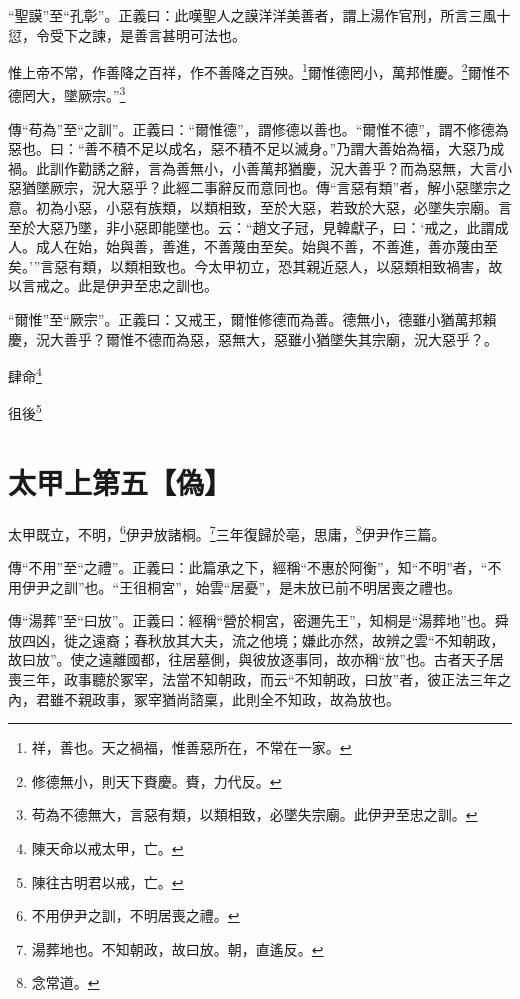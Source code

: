 {\noindent\shu{}\fzkt “聖謨”至“孔彰”。正義曰：此嘆聖人之謨洋洋美善者，謂上湯作官刑，所言三風十愆，令受下之諫，是善言甚明可法也。 \par}

惟上帝不常，作善降之百祥，作不善降之百殃。\footnote{祥，善也。天之禍福，惟善惡所在，不常在一家。}爾惟德罔小，萬邦惟慶。\footnote{修德無小，則天下賚慶。賚，力代反。}爾惟不德罔大，墜厥宗。”\footnote{苟為不德無大，言惡有類，以類相致，必墜失宗廟。此伊尹至忠之訓。}


{\noindent\zhuan{}\fzbyks 傳“苟為”至“之訓”。正義曰：“爾惟德”，謂修德以善也。“爾惟不德”，謂不修德為惡也。曰：“善不積不足以成名，惡不積不足以滅身。”乃謂大善始為福，大惡乃成禍。此訓作勸誘之辭，言為善無小，小善萬邦猶慶，況大善乎？而為惡無，大言小惡猶墜厥宗，況大惡乎？此經二事辭反而意同也。傳“言惡有類”者，解小惡墜宗之意。初為小惡，小惡有族類，以類相致，至於大惡，若致於大惡，必墜失宗廟。言至於大惡乃墜，非小惡即能墜也。云：“趙文子冠，見韓獻子，曰：‘戒之，此謂成人。成人在始，始與善，善進，不善蔑由至矣。始與不善，不善進，善亦蔑由至矣。’”言惡有類，以類相致也。今太甲初立，恐其親近惡人，以惡類相致禍害，故以言戒之。此是伊尹至忠之訓也。 \par}

{\noindent\shu{}\fzkt “爾惟”至“厥宗”。正義曰：又戒王，爾惟修德而為善。德無小，德雖小猶萬邦賴慶，況大善乎？爾惟不德而為惡，惡無大，惡雖小猶墜失其宗廟，況大惡乎？。 \par}

肆命\footnote{陳天命以戒太甲，亡。}

徂後\footnote{陳往古明君以戒，亡。}

\section{太甲上第五【偽】}


太甲既立，不明，\footnote{不用伊尹之訓，不明居喪之禮。}伊尹放諸桐。\footnote{湯葬地也。不知朝政，故曰放。朝，直遙反。}三年復歸於亳，思庸，\footnote{念常道。}伊尹作三篇。


{\noindent\zhuan{}\fzbyks 傳“不用”至“之禮”。正義曰：此篇承之下，經稱“不惠於阿衡”，知“不明”者，“不用伊尹之訓”也。“王徂桐宮”，始雲“居憂”，是未放已前不明居喪之禮也。 \par}

{\noindent\zhuan{}\fzbyks 傳“湯葬”至“曰放”。正義曰：經稱“營於桐宮，密邇先王”，知桐是“湯葬地”也。舜放四凶，徙之遠裔；春秋放其大夫，流之他境；嫌此亦然，故辨之雲“不知朝政，故曰放”。使之遠離國都，往居墓側，與彼放逐事同，故亦稱“放”也。古者天子居喪三年，政事聽於冢宰，法當不知朝政，而云“不知朝政，曰放”者，彼正法三年之內，君雖不親政事，冢宰猶尚諮稟，此則全不知政，故為放也。 \par}

